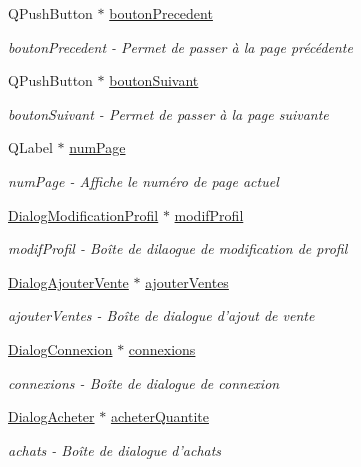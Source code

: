 \begin{DoxyCompactItemize}
Q\-Push\-Button $\ast$ \hyperlink{class_ma_fenetre_a53b01801ba121b8240df4f1f8c9330b3}{bouton\-Precedent}
\begin{DoxyCompactList}\small\item\em bouton\-Precedent -\/ Permet de passer à la page précédente \end{DoxyCompactList}\item 
Q\-Push\-Button $\ast$ \hyperlink{class_ma_fenetre_a54110f455a71febc15224b68470dd80e}{bouton\-Suivant}
\begin{DoxyCompactList}\small\item\em bouton\-Suivant -\/ Permet de passer à la page suivante \end{DoxyCompactList}\item 
Q\-Label $\ast$ \hyperlink{class_ma_fenetre_a941eff753d1e20d0ef212aa875570330}{num\-Page}
\begin{DoxyCompactList}\small\item\em num\-Page -\/ Affiche le numéro de page actuel \end{DoxyCompactList}\item 
\hyperlink{class_dialog_modification_profil}{Dialog\-Modification\-Profil} $\ast$ \hyperlink{class_ma_fenetre_accfaae414323cd476f255f51a98414f0}{modif\-Profil}
\begin{DoxyCompactList}\small\item\em modif\-Profil -\/ Boîte de dilaogue de modification de profil \end{DoxyCompactList}\item 
\hyperlink{class_dialog_ajouter_vente}{Dialog\-Ajouter\-Vente} $\ast$ \hyperlink{class_ma_fenetre_a2332279c45b76ac1c9daf739c0bb3958}{ajouter\-Ventes}
\begin{DoxyCompactList}\small\item\em ajouter\-Ventes -\/ Boîte de dialogue d'ajout de vente \end{DoxyCompactList}\item 
\hyperlink{class_dialog_connexion}{Dialog\-Connexion} $\ast$ \hyperlink{class_ma_fenetre_a3c115601ad85a01422813dcdf48eb44d}{connexions}
\begin{DoxyCompactList}\small\item\em connexions -\/ Boîte de dialogue de connexion \end{DoxyCompactList}\item 
\hyperlink{class_dialog_acheter}{Dialog\-Acheter} $\ast$ \hyperlink{class_ma_fenetre_a8682e6343da2d0c2bfe1fab3ff0e7baa}{acheter\-Quantite}
\begin{DoxyCompactList}\small\item\em achats -\/ Boîte de dialogue d'achats \end{DoxyCompactList}\item 

\end{DoxyCompactItemize}
